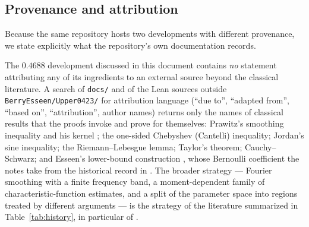 \documentclass[10pt,a4paper]{article}
\theoremstyle{plain}
\theoremstyle{definition}
\newcommand{\file}[1]{\texttt{#1}}
\begin{document}
\subsection{Provenance and attribution}
\label{sec:provenance}

Because the same repository hosts two developments with different provenance,
we state explicitly what the repository's own documentation records.

The $0.4688$ development discussed in this document contains \emph{no}
statement attributing any of its ingredients to an external source beyond the
classical literature. A search of \file{docs/} and of the Lean sources outside
\file{BerryEsseen/Upper0423/} for attribution language (``due to'', ``adapted
from'', ``based on'', ``attribution'', author names) returns only the names of
classical results that the proofs invoke and prove for themselves: Prawitz's
smoothing inequality and his kernel \cite{Prawitz1972}; the one-sided
Chebyshev (Cantelli) inequality; Jordan's sine inequality; the
Riemann--Lebesgue lemma; Taylor's theorem; Cauchy--Schwarz; and Esseen's
lower-bound construction \cite{Esseen1956}, whose Bernoulli coefficient the
notes take from the historical record in \cite{Zolotukhin2018}. The broader
strategy --- Fourier smoothing with a finite frequency band, a
moment-dependent family of characteristic-function estimates, and a split of
the parameter space into regions treated by different arguments --- is the
strategy of the literature summarized in Table~\ref{tab:history}, in
particular of \cite{Zolotarev1967,vanBeek1972,Shiganov1986,Shevtsova2006,%
KorolevShevtsova2009,Tyurin2009,Shevtsova2011,Shevtsova2013}.
\end{document}
